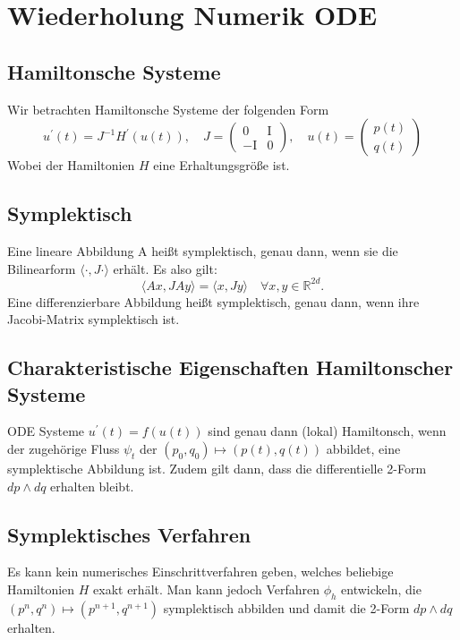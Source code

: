 \documentclass{handout}
\begin{document}
\maketitle

\section{Wiederholung Numerik ODE}
\subsection{Hamiltonsche Systeme}
Wir betrachten Hamiltonsche Systeme der folgenden Form
\begin{equation}
u^{\prime}(t)=J^{-1} H^{\prime}(u(t)),  \quad J=\left(\begin{array}{cc}
0 & \mathrm{I} \\
-\mathrm{I} & 0
\end{array}\right), \quad u(t) = \left(\begin{array}{c} p(t) \\ q(t) \end{array}\right)
\end{equation}
Wobei der Hamiltonien $H$ eine Erhaltungsgröße ist.

\subsection{Symplektisch}
Eine lineare Abbildung A heißt symplektisch, genau dann, wenn sie die Bilinearform $\langle \cdot,J\cdot\rangle$ erhält. Es also gilt:
\begin{equation}
    \langle Ax, J Ay\rangle = \langle x, J y\rangle \quad \forall x,y \in \mathbb{R}^{2d}.
\end{equation}
Eine differenzierbare Abbildung heißt symplektisch, genau dann, wenn ihre Jacobi-Matrix symplektisch ist. 

\subsection{Charakteristische Eigenschaften Hamiltonscher Systeme}

ODE Systeme $u^{\prime}(t)=f(u(t))$ sind genau dann (lokal) Hamiltonsch, wenn der zugehörige Fluss $\psi_t$ der $(p_0,q_0) \mapsto (p(t),q(t))$ abbildet, eine symplektische Abbildung ist. Zudem gilt dann, dass die differentielle 2-Form $dp\wedge dq$ erhalten bleibt.

\subsection{Symplektisches Verfahren}
Es kann kein numerisches Einschrittverfahren geben, welches beliebige Hamiltonien $H$ exakt erhält. Man kann jedoch Verfahren $\phi_h$ entwickeln, die $(p^n,q^n) \mapsto (p^{n+1},q^{n+1})$ symplektisch abbilden und damit die 2-Form $dp\wedge dq$ erhalten.
\end{document}
